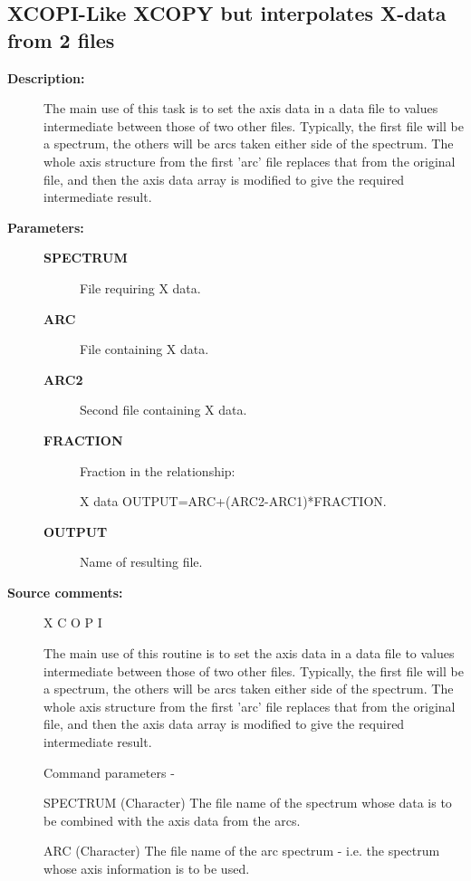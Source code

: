 \subsection{XCOPI-\label{XCOPI}Like XCOPY but interpolates X-data from 2 files}
\begin{description}

\item [\textbf{Description:}]
 The main use of this task is to set the axis data in
 a data file to values intermediate between those of
 two other files.  Typically, the first file will be a
 spectrum, the others will be arcs taken either side
 of the spectrum.  The whole axis structure from the first
 'arc' file replaces that from the original file, and then
 the axis data array is modified to give the required
 intermediate result.

\item [\textbf{Parameters:}]
\begin{description}
\item [\textbf{SPECTRUM}]
 File requiring X data.
\item [\textbf{ARC}]
 File containing X data.
\item [\textbf{ARC2}]
 Second file containing X data.
\item [\textbf{FRACTION}]
 Fraction in the relationship:

    X data OUTPUT=ARC+(ARC2-ARC1)*FRACTION.

\item [\textbf{OUTPUT}]
 Name of resulting file.
\end{description}

\item [\textbf{Source comments:}]
\begin{terminalv}
 X C O P I

 The main use of this routine is to set the axis data in
 a data file to values intermediate between those of
 two other files.  Typically, the first file will be a
 spectrum, the others will be arcs taken either side
 of the spectrum.  The whole axis structure from the first
 'arc' file replaces that from the original file, and then
 the axis data array is modified to give the required
 intermediate result.

 Command parameters -

 SPECTRUM    (Character) The file name of the spectrum whose
             data is to be combined with the axis data from the
             arcs.

 ARC         (Character) The file name of the arc spectrum - i.e.
             the spectrum whose axis information is to be used.


\end{terminalv}
\end{description}
